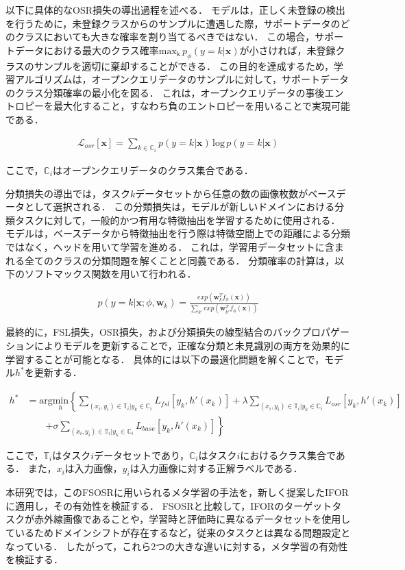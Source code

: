 \documentclass[a4paper,11pt,nomag]{jsreport}
\begin{document}
以下に具体的なOSR損失の導出過程を述べる．
モデルは，正しく未登録の検出を行うために，未登録クラスからのサンプルに遭遇した際，サポートデータのどのクラスにおいても大きな確率を割り当てるべきではない．
この場合，サポートデータにおける最大のクラス確率$ \mathrm{max_k}\,p_\phi(y=k|\mathbf{x}) $が小さければ，未登録クラスのサンプルを適切に棄却することができる．
この目的を達成するため，学習アルゴリズムは，オープンクエリデータのサンプルに対して，サポートデータのクラス分類確率の最小化を図る．
これは，オープンクエリデータの事後エントロピーを最大化すること，すなわち負のエントロピーを用いることで実現可能である．

\begin{align}
    \mathcal{L}_{osr}[\mathbf{x}]=\sum_{k\in\mathbb{C}_i}p(y=k|\mathbf{x})\,\textrm{log}\,p(y=k|\mathbf{x})
\end{align}

\noindent
ここで，$\mathbb{C}_i$はオープンクエリデータのクラス集合である．

分類損失の導出では，タスク$k$データセットから任意の数の画像枚数がベースデータとして選択される．
この分類損失は，モデルが新しいドメインにおける分類タスクに対して，一般的かつ有用な特徴抽出を学習するために使用される．
モデルは，ベースデータから特徴抽出を行う際は特徴空間上での距離による分類ではなく，ヘッドを用いて学習を進める．
これは，学習用データセットに含まれる全てのクラスの分類問題を解くことと同義である．
分類確率の計算は，以下のソフトマックス関数を用いて行われる．

\begin{align}
    p(y=k|\mathbf{x};\phi,\mathbf{w}_k)=\frac{exp(\mathbf{w}_k^Tf_{\phi}(\mathbf{x}))}{\sum_{k'}exp(\mathbf{w}_{k'}^Tf_{\phi}(\mathbf{x}))}
\end{align}

最終的に，FSL損失，OSR損失，および分類損失の線型結合のバックプロパゲーションによりモデルを更新することで，正確な分類と未見識別の両方を効果的に学習することが可能となる．
具体的には以下の最適化問題を解くことで，モデル$h^*$を更新する．

\begin{align}
    h^* & = \textrm{arg}\underset{h}{\textrm{min}}\left\{\sum_{(x_i,y_i)\in\mathbb{T}_i|y_k\in\mathbb{C}_i}L_{fsl}[y_k,h'(x_k)]+\lambda\sum_{(x_i,y_i)\in\mathbb{T}_i|y_k\in\mathbb{C}_i}L_{osr}[y_k,h'(x_k)]\right. \nonumber \\
        & \qquad \left.+ \sigma\sum_{(x_i,y_i)\in\mathbb{T}_i|y_k\in\mathbb{C}_i}L_{base}[y_k,h'(x_k)]\right\}
\end{align}

\noindent
ここで，$\mathbb{T}_i$はタスク$i$データセットであり，$\mathbb{C}_i$はタスク$i$におけるクラス集合である．
また，$x_i$は入力画像，$y_i$は入力画像に対する正解ラベルである．

本研究では，このFSOSRに用いられるメタ学習の手法を，新しく提案したIFORに適用し，その有効性を検証する．
FSOSRと比較して，IFORのターゲットタスクが赤外線画像であることや，学習時と評価時に異なるデータセットを使用しているためドメインシフトが存在するなど，従来のタスクとは異なる問題設定となっている．
したがって，これら2つの大きな違いに対する，メタ学習の有効性を検証する．



\end{document}
